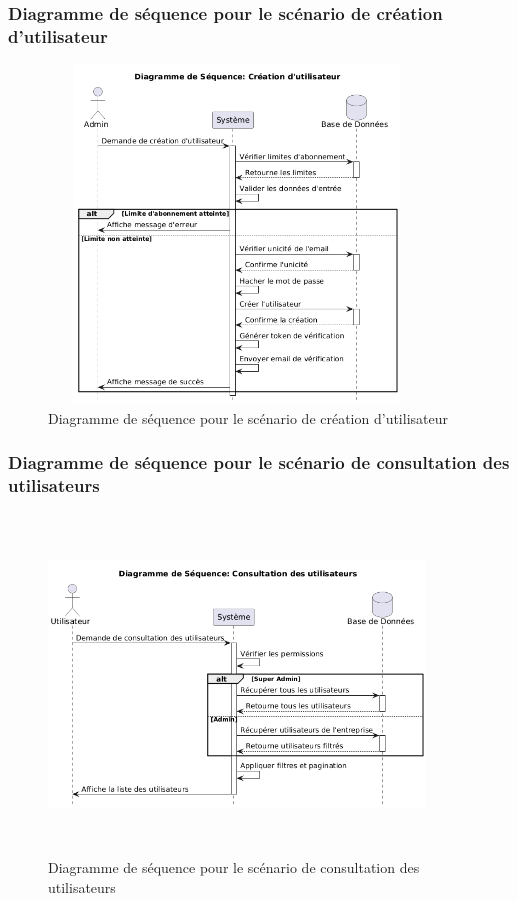 \subsubsection{Diagramme de séquence pour le scénario de création d'utilisateur}
\begin{figure}[H]
    \centering
    \includegraphics[width=10cm,height=9cm]{images/createusersq.png}
    \caption{Diagramme de séquence pour le scénario de création d'utilisateur}
\end{figure}

\subsubsection{Diagramme de séquence pour le scénario de consultation des utilisateurs}
\begin{figure}[H]
    \centering
    \includegraphics[width=10cm,height=9cm]{images/consultusersq.png}
    \caption{Diagramme de séquence pour le scénario de consultation des utilisateurs}
\end{figure}

